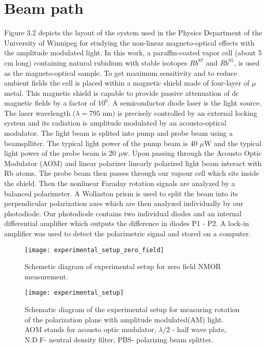 \documentclass[12pt]{report}
\begin{document}
\section{Beam path}
 Figure 3.2 depicts the layout of the system used in the Physics Department of the University of Winnipeg for studying the non-linear magneto-optical effects with the amplitude modulated light. In this work, a paraffin-coated vapor cell (about 5 cm long) containing natural rubidium with stable isotopes $Rb^{87}$ and $Rb^{85}$, is used as the magneto-optical sample. To get maximum sensitivity and to reduce ambient fields the cell is placed within a magnetic shield made of four-layer of $\mu$ metal. This magnetic shield is capable to provide passive attenuation of dc magnetic fields by a factor of $10^6$. A semiconductor diode laser is the light source. The laser wavelength ($\lambda=795$ nm) is precisely controlled by an external locking system and its radiation is amplitude modulated by an acousto-optical modulator.  The light beam is splited into pump and probe beam using a beamsplliter. The typical light power of the pump beam is 40 $\mu$W and the typical light power of the probe beam is 20  $\mu$w. Upon passing through the Acousto Optic Modulator (AOM) and linear polarizer  linearly polarized light beam interact with Rb atoms. The probe beam then passes through our vapour cell which sits inside the shield. Then the nonlinear Faraday rotation signals are analyzed by a balanced polarimeter.  A Wollaston prism is used to split the beam into its perpendicular polarization axes which are then analyzed individually by our photodiode. Our photodiode contains two individual diodes and an internal differential amplifier which outputs the difference in diodes P1 - P2. A lock-in amplifier was used to detect the polarimetric signal and stored on a computer.
\begin{figure}[h]
\centering
\texttt{[image: experimental\_setup\_zero\_field]}
\caption{Schemetic diagram of experimental setup  for zero field NMOR measurement.}
\end{figure}
\begin{figure}[h]
\centering
\texttt{[image: experimental\_setup]}
\caption{Schematic diagram of the experimental setup for measuring rotation of the polarization plane with amplitude modulated(AM) light. AOM stands for acousto optic modulator, $\lambda/2$ - half wave plate, N.D.F- neutral density filter, PBS- polarizing beam splitter.}
\end{figure}
\end{document}

